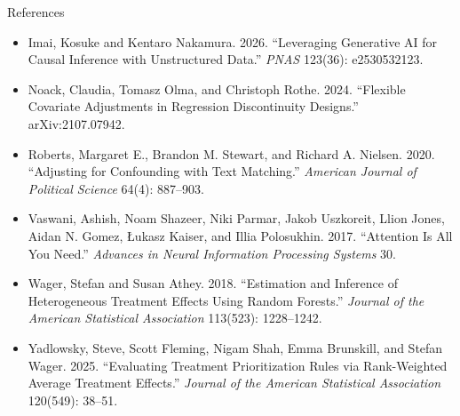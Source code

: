\documentclass[aspectratio=169,11pt,xcolor=dvipsnames]{beamer}
\begin{document}
\begin{frame}[allowframebreaks,t]{References}
\begin{itemize}
\item Imai, Kosuke and Kentaro Nakamura. 2026. ``Leveraging Generative AI for Causal Inference with Unstructured Data.'' \textit{PNAS} 123(36): e2530532123.
\item Noack, Claudia, Tomasz Olma, and Christoph Rothe. 2024. ``Flexible Covariate Adjustments in Regression Discontinuity Designs.'' arXiv:2107.07942.
\item Roberts, Margaret E., Brandon M. Stewart, and Richard A. Nielsen. 2020. ``Adjusting for Confounding with Text Matching.'' \textit{American Journal of Political Science} 64(4): 887--903.
\item Vaswani, Ashish, Noam Shazeer, Niki Parmar, Jakob Uszkoreit, Llion Jones, Aidan N. Gomez, \L{}ukasz Kaiser, and Illia Polosukhin. 2017. ``Attention Is All You Need.'' \textit{Advances in Neural Information Processing Systems} 30.
\item Wager, Stefan and Susan Athey. 2018. ``Estimation and Inference of Heterogeneous Treatment Effects Using Random Forests.'' \textit{Journal of the American Statistical Association} 113(523): 1228--1242.
\item Yadlowsky, Steve, Scott Fleming, Nigam Shah, Emma Brunskill, and Stefan Wager. 2025. ``Evaluating Treatment Prioritization Rules via Rank-Weighted Average Treatment Effects.'' \textit{Journal of the American Statistical Association} 120(549): 38--51.
\end{itemize}
\end{frame}
\end{document}
